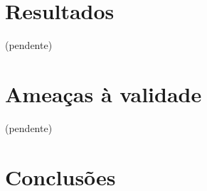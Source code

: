 %
%
%
%

\section{Resultados}

(pendente)

\section{Ameaças à validade}

(pendente)

\section{Conclusões}

